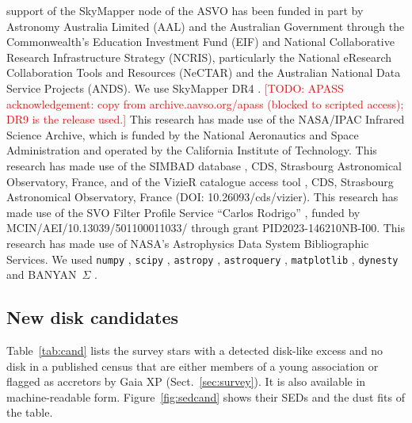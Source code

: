 \documentclass{aa}
\newcommand{\todo}[1]{\textcolor{red}{[TODO: #1]}}
\begin{document}
\begin{acknowledgements}
support of the SkyMapper node of the ASVO has been funded in part by Astronomy
Australia Limited (AAL) and the Australian Government through the
Commonwealth's Education Investment Fund (EIF) and National Collaborative
Research Infrastructure Strategy (NCRIS), particularly the National eResearch
Collaboration Tools and Resources (NeCTAR) and the Australian National Data
Service Projects (ANDS). We use SkyMapper DR4 \citep[][doi:10.25914/5M47-S621]{onken2024}.
\todo{APASS acknowledgement: copy from archive.aavso.org/apass (blocked to
scripted access); DR9 is the release used.}
This research has made use of the NASA/IPAC Infrared Science Archive, which is
funded by the National Aeronautics and Space Administration and operated by the
California Institute of Technology.
This research has made use of the SIMBAD database \citep{wenger2000}, CDS,
Strasbourg Astronomical Observatory, France, and of the VizieR catalogue access
tool \citep{ochsenbein2000}, CDS, Strasbourg Astronomical Observatory, France
(DOI: 10.26093/cds/vizier).
This research has made use of the SVO Filter Profile Service ``Carlos Rodrigo''
\citep{rodrigo2024}, funded by MCIN/AEI/10.13039/501100011033/ through grant
PID2023-146210NB-I00.
This research has made use of NASA's Astrophysics Data System Bibliographic
Services.
We used \texttt{numpy} \citep{harris2020}, \texttt{scipy} \citep{virtanen2020},
\texttt{astropy} \citep{astropy2013,astropy2018,astropy2022},
\texttt{astroquery} \citep{ginsburg2019}, \texttt{matplotlib}
\citep{hunter2007}, \texttt{dynesty} \citep{speagle2020} and BANYAN~$\Sigma$
\citep{gagne2018}.
\end{acknowledgements}




\begin{appendix}
\onecolumn
\section{New disk candidates}
\label{app:cand}
Table~\ref{tab:cand} lists the survey stars with a detected disk-like excess and
no disk in a published census that are either members of a young
association or flagged as accretors by Gaia XP (Sect.~\ref{sec:survey}). It is
also available in machine-readable form. Figure~\ref{fig:sedcand} shows their
SEDs and the dust fits of the table.


\end{appendix}
\end{document}
